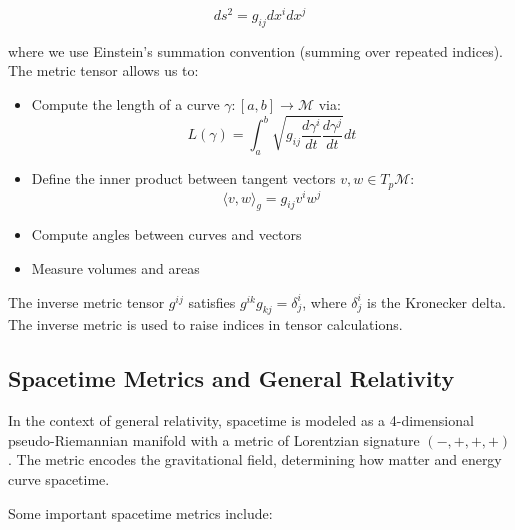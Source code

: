 \documentclass[11pt,a4paper]{article}
\begin{document}
\begin{equation}
    ds^2 = g_{ij} dx^i dx^j
\end{equation}

where we use Einstein's summation convention (summing over repeated indices). The metric tensor allows us to:

\begin{itemize}
    \item Compute the length of a curve $\gamma: [a, b] \to \mathcal{M}$ via:
    \begin{equation}
        L(\gamma) = \int_a^b \sqrt{g_{ij} \frac{d\gamma^i}{dt} \frac{d\gamma^j}{dt}} dt
    \end{equation}
    
    \item Define the inner product between tangent vectors $v, w \in T_p\mathcal{M}$:
    \begin{equation}
        \langle v, w \rangle_g = g_{ij} v^i w^j
    \end{equation}
    
    \item Compute angles between curves and vectors
    
    \item Measure volumes and areas
\end{itemize}

The inverse metric tensor $g^{ij}$ satisfies $g^{ik}g_{kj} = \delta^i_j$, where $\delta^i_j$ is the Kronecker delta. The inverse metric is used to raise indices in tensor calculations.

\subsection{Spacetime Metrics and General Relativity}

In the context of general relativity, spacetime is modeled as a 4-dimensional pseudo-Riemannian manifold with a metric of Lorentzian signature $(-,+,+,+)$. The metric encodes the gravitational field, determining how matter and energy curve spacetime.

Some important spacetime metrics include:
\end{document}
